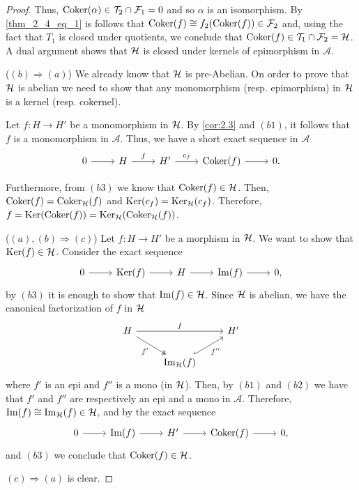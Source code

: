 \begin{proof}
  Thus, $\operatorname{Coker}(\alpha)\in\mathcal{T}_2\cap\mathcal{F}_1=0$ and so $\alpha$ is an isomorphism. By \eqref{thm_2_4_eq_1} is follows that $\operatorname{Coker}(f)\cong f_2(\operatorname{Coker}(f))\in\mathcal{F}_2$ and, using the fact that $T_1$ is closed under quotients, we conclude that $\operatorname{Coker}(f)\in\mathcal{T}_1\cap\mathcal{F}_2=\mathcal{H}$. A dual argument shows that $\mathcal{H}$ is closed under kernels of epimorphism in $\mathscr{A}$.

  ($(b)\Rightarrow (a)$) We already know that $\mathcal{H}$ is pre-Abelian. On order to prove that $\mathcal{H}$ is abelian we need to show that any monomorphism (resp. epimorphism) in $\mathcal{H}$ is a kernel (resp. cokernel).

  Let $f:H\to H'$ be a monomorphism in $\mathcal{H}$. By \ref{cor:2.3} and $(b1)$, it follows that $f$ is a monomorphism in $\mathscr{A}$. Thus, we have a short exact sequence in $\mathscr{A}$
  \begin{equation*}
    \begin{tikzcd}
      0 \arrow{r}
      & H\arrow{r}{f}
        & H'\arrow{r}{c_f}
          & \Coker(f) \arrow{r}
            & 0.
    \end{tikzcd}
  \end{equation*}

  Furthermore, from $(b3)$ we know that $\operatorname{Coker}(f)\in\mathcal{H}$. Then, $\operatorname{Coker}(f)=\operatorname{Coker}_{\mathcal{H}}(f)$ and $\operatorname{Ker}(c_f)=\operatorname{Ker}_{\mathcal{H}}(c_f)$. Therefore, $f=\operatorname{Ker}(\operatorname{Coker}(f))=\operatorname{Ker}_{\mathcal{H}}(\operatorname{Coker}_{\mathcal{H}}(f))$.

  ($(a),(b)\Rightarrow (c)$) Let $f:H\to H'$ be a morphism in $\mathcal{H}$. We want to show that $\operatorname{Ker}(f)\in\mathcal{H}$. Consider the exact sequence
  \begin{equation*}
    \begin{tikzcd}
      0 \arrow{r}
      & \Ker(f)\arrow{r}
        & H\arrow{r}
          & \Img(f) \arrow{r}
            & 0,
    \end{tikzcd}
  \end{equation*}
  by $(b3)$ it is enough to show that $\operatorname{Im}(f)\in\mathcal{H}$. Since $\mathcal{H}$ is abelian, we have the canonical factorization of $f$ in $\mathcal{H}$
  \begin{equation*}
    \begin{tikzcd}
      H\arrow{rr}{f}\arrow[two heads]{rd}[']{f'}
      & & H'\\
      & \Img_\clH(f)\arrow[hook]{ur}[']{f''}
        &
    \end{tikzcd}
  \end{equation*}
  where $f'$ is an epi and $f''$ is a mono (in $\mathcal{H}$). Then, by $(b1)$ and $(b2)$ we have that $f'$ and $f''$ are respectively an epi and a mono in $\mathscr{A}$. Therefore, $\operatorname{Im}(f)\cong \operatorname{Im}_{\mathcal{H}}(f)\in\mathcal{H}$, and by the exact sequence
  \begin{equation*}
    \begin{tikzcd}
      0 \arrow{r}
      & \Img(f)\arrow{r}
        & H'\arrow{r}
          & \Coker(f) \arrow{r}
            & 0,
    \end{tikzcd}
  \end{equation*}
  and $(b3)$ we conclude that $\operatorname{Coker}(f)\in\mathcal{H}$.

  $(c)\Rightarrow (a)$ is clear.

\end{proof}


